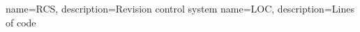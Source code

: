 \makeglossaries
{}
{
    name=RCS,
    description={Revision control system}
}
{
    name=LOC,
    description={Lines of code}
}